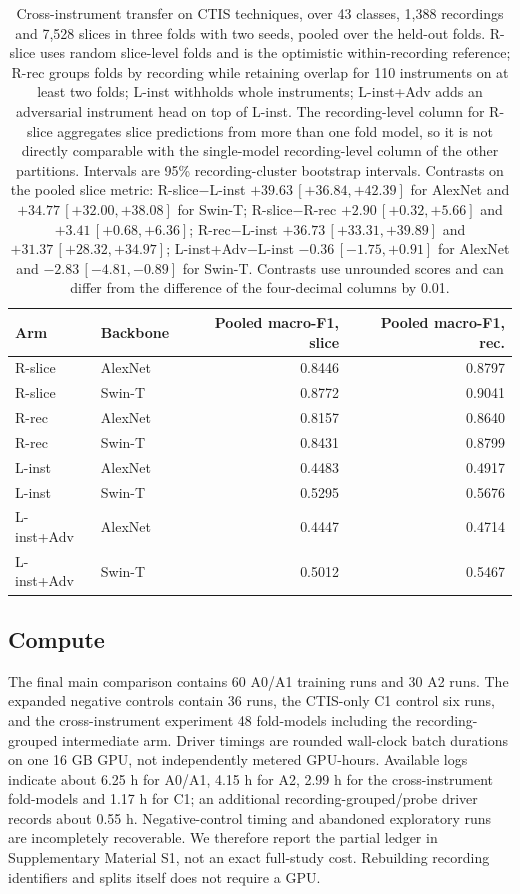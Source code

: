 \begin{table}[t]
\centering
\caption{Cross-instrument transfer on CTIS techniques, over 43 classes, 1{,}388 recordings and
7{,}528 slices in three folds with two seeds, pooled over the held-out folds. R-slice uses random slice-level folds and
is the optimistic within-recording reference; R-rec groups folds by recording while retaining overlap for 110 instruments on at least two folds; L-inst withholds whole instruments; L-inst+Adv adds an adversarial instrument head on top of
L-inst. The recording-level column for R-slice aggregates slice predictions from more than one
fold model, so it is not directly comparable with the single-model recording-level column of the
other partitions. Intervals are 95\% recording-cluster bootstrap intervals. Contrasts on the pooled slice metric: R-slice$-$L-inst
$+39.63\,[+36.84,+42.39]$ for AlexNet and $+34.77\,[+32.00,+38.08]$ for Swin-T; R-slice$-$R-rec
$+2.90\,[+0.32,+5.66]$ and $+3.41\,[+0.68,+6.36]$; R-rec$-$L-inst
$+36.73\,[+33.31,+39.89]$ and $+31.37\,[+28.32,+34.97]$; L-inst+Adv$-$L-inst $-0.36\,[-1.75,+0.91]$ for AlexNet
and $-2.83\,[-4.81,-0.89]$ for Swin-T. Contrasts use unrounded scores and can
differ from the difference of the four-decimal columns by 0.01.}
\label{tab:p3}
\footnotesize
\setlength{\tabcolsep}{3.6pt}
\begin{tabular}{llrr}
\toprule
Arm & Backbone & Pooled macro-F1, slice & Pooled macro-F1, rec. \\
\midrule
R-slice         & AlexNet & 0.8446 & 0.8797 \\
R-slice         & Swin-T  & 0.8772 & 0.9041 \\
R-rec & AlexNet & 0.8157 & 0.8640 \\
R-rec & Swin-T  & 0.8431 & 0.8799 \\
L-inst & AlexNet & 0.4483 & 0.4917 \\
L-inst & Swin-T  & 0.5295 & 0.5676 \\
L-inst+Adv      & AlexNet & 0.4447 & 0.4714 \\
L-inst+Adv      & Swin-T  & 0.5012 & 0.5467 \\
\bottomrule
\end{tabular}
\end{table}

\subsection{Compute}

The final main comparison contains 60 A0/A1 training runs and 30 A2 runs. The expanded
negative controls contain 36 runs, the CTIS-only C1 control six runs, and the cross-instrument
experiment 48 fold-models including the recording-grouped intermediate arm. Driver timings
are rounded wall-clock batch durations on one 16 GB GPU, not independently metered GPU-hours.
Available logs indicate about 6.25 h for A0/A1, 4.15 h for A2, 2.99 h for the cross-instrument
fold-models and 1.17 h for C1; an additional recording-grouped/probe driver records about
0.55 h. Negative-control timing and abandoned exploratory runs are incompletely recoverable.
We therefore report the partial ledger in Supplementary Material S1, not an exact full-study
cost. Rebuilding recording identifiers and splits itself does not require a GPU.
